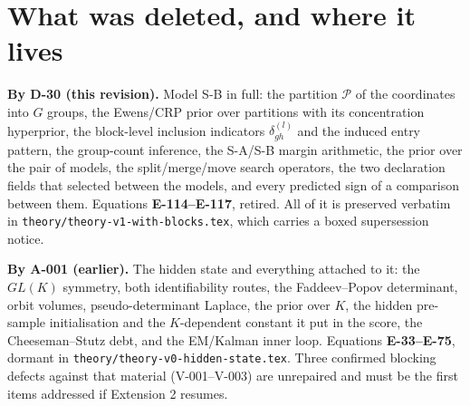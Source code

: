 \section{What was deleted, and where it lives}

\textbf{By D-30 (this revision).} Model S-B in full: the partition $\mathcal{P}$ of
the coordinates into $G$ groups, the Ewens/CRP prior over partitions with its
concentration hyperprior, the block-level inclusion indicators $\delta_{gh}^{(l)}$
and the induced entry pattern, the group-count inference, the S-A/S-B margin
arithmetic, the prior over the pair of models, the split/merge/move search operators,
the two declaration fields that selected between the models, and every predicted sign
of a comparison between them. Equations \textbf{E-114--E-117}, retired. All of it is
preserved verbatim in \texttt{theory/theory-v1-with-blocks.tex}, which carries a
boxed supersession notice.

\textbf{By A-001 (earlier).} The hidden state and everything attached to it: the
$GL(K)$ symmetry, both identifiability routes, the Faddeev--Popov determinant, orbit
volumes, pseudo-determinant Laplace, the prior over $K$, the hidden pre-sample
initialisation and the $K$-dependent constant it put in the score, the
Cheeseman--Stutz debt, and the EM/Kalman inner loop. Equations \textbf{E-33--E-75},
dormant in \texttt{theory/theory-v0-hidden-state.tex}. Three confirmed blocking
defects against that material (V-001--V-003) are unrepaired and must be the first
items addressed if Extension 2 resumes.



